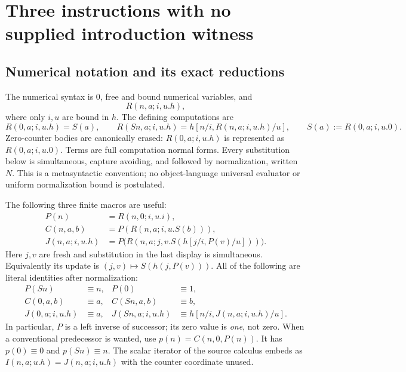 \section{Three instructions with no supplied introduction witness}
\label{sec:three-rule-core}

\subsection{Numerical notation and its exact reductions}

The numerical syntax is $0$, free and bound numerical variables, and
\[
                       R(n,a;i,u.h),
\]
where only $i,u$ are bound in $h$.  The defining computations are
\[
 R(0,a;i,u.h)=S(a),\qquad
 R(Sn,a;i,u.h)=h[n/i,R(n,a;i,u.h)/u],
 \qquad S(a):=R(0,a;i,u.0).
\]
Zero-counter bodies are canonically erased: $R(0,a;i,u.h)$ is represented
as $R(0,a;i,u.0)$.  Terms are full computation normal forms.  Every
substitution below is simultaneous, capture avoiding, and followed by
normalization, written $N$.  This is a metasyntactic convention; no
object-language universal evaluator or uniform normalization bound is
postulated.

The following three finite macros are useful:
\begin{align*}
 P(n)&=R(n,0;i,u.i),\\
 C(n,a,b)&=P(R(n,a;i,u.S(b))),\\
 J(n,a;i,u.h)&=P\bigl(R(n,a;j,v.S(h[j/i,P(v)/u]))\bigr).
\end{align*}
Here $j,v$ are fresh and substitution in the last display is simultaneous.
Equivalently its update is $(j,v)\mapsto S(h(j,P(v)))$.
All of the following are literal identities after normalization:
\begin{align*}
 P(Sn)&\equiv n,&P(0)&\equiv1,\\
 C(0,a,b)&\equiv a,&C(Sn,a,b)&\equiv b,\\
 J(0,a;i,u.h)&\equiv a,
 &J(Sn,a;i,u.h)&\equiv h[n/i,J(n,a;i,u.h)/u].
\end{align*}
In particular, $P$ is a left inverse of successor; its zero value is
\emph{one}, not zero.  When a conventional predecessor is wanted, use
$p(n)=C(n,0,P(n))$.  It has $p(0)\equiv0$ and $p(Sn)\equiv n$.
The scalar iterator of the source calculus embeds as
$I(n,a;u.h)=J(n,a;i,u.h)$ with the counter coordinate unused.

